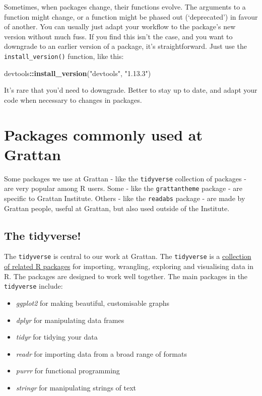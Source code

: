 \documentclass[]{book}
\newenvironment{Shaded}{\begin{snugshade}}{\end{snugshade}}
\newcommand{\KeywordTok}[1]{\textcolor[rgb]{0.13,0.29,0.53}{\textbf{#1}}}
\newcommand{\NormalTok}[1]{#1}
\newcommand{\OperatorTok}[1]{\textcolor[rgb]{0.81,0.36,0.00}{\textbf{#1}}}
\newcommand{\StringTok}[1]{\textcolor[rgb]{0.31,0.60,0.02}{#1}}
\providecommand{\tightlist}{%
  \setlength{\itemsep}{0pt}\setlength{\parskip}{0pt}}
\begin{document}
Sometimes, when packages change, their functions evolve. The arguments to a function might change, or a function might be phased out (`deprecated') in favour of another. You can usually just adapt your workflow to the package's new version without much fuss. If you find this isn't the case, and you want to downgrade to an earlier version of a package, it's straightforward. Just use the \texttt{install\_version()} function, like this:

\begin{Shaded}
\begin{Highlighting}[]
\NormalTok{devtools}\OperatorTok{::}\KeywordTok{install_version}\NormalTok{(}\StringTok{"devtools"}\NormalTok{, }\StringTok{"1.13.3"}\NormalTok{)}
\end{Highlighting}
\end{Shaded}

It's rare that you'd need to downgrade. Better to stay up to date, and adapt your code when necessary to changes in packages.

\hypertarget{packages-commonly-used-at-grattan}{%
\chapter{Packages commonly used at Grattan}\label{packages-commonly-used-at-grattan}}

Some packages we use at Grattan - like the \texttt{tidyverse} collection of packages - are very popular among R users. Some - like the \texttt{grattantheme} package - are specific to Grattan Institute. Others - like the \texttt{readabs} package - are made by Grattan people, useful at Grattan, but also used outside of the Institute.

\hypertarget{tidyverse}{%
\section{The tidyverse!}\label{tidyverse}}

The \texttt{tidyverse} is central to our work at Grattan. The \texttt{tidyverse} is a \href{https://www.tidyverse.org/packages/}{collection of related R packages} for importing, wrangling, exploring and visualising data in R. The packages are designed to work well together.
The main packages in the \texttt{tidyverse} include:

\begin{itemize}
\tightlist
\item
  \emph{ggplot2} for making beautiful, customisable graphs
\item
  \emph{dplyr} for manipulating data frames
\item
  \emph{tidyr} for tidying your data
\item
  \emph{readr} for importing data from a broad range of formats
\item
  \emph{purrr} for functional programming
\item
  \emph{stringr} for manipulating strings of text
\end{itemize}
\end{document}

